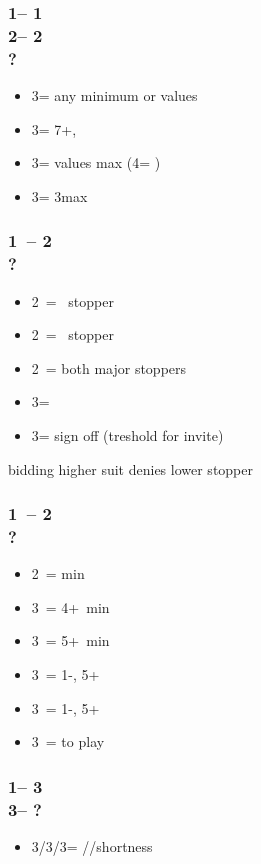 \documentclass[12pt, a4paper]{article}
\begin{document}
\subsubsection*{1\diams -- 1\spades\\
                2\diams -- 2\nt \\ ?}
\begin{itemize}
    \item 3\clubs = any minimum or \clubs values
    \item 3\diams = 7+\diams, \gf
    \item 3\hearts = \hearts values max (4\diams = \nf)
    \item 3\spades = 3\spades max
\end{itemize}

\subsubsection*{1\diams\ -- 2\diams \\ ?}
\begin{itemize}
    \item 2\hearts\ = \hearts\ stopper
    \item 2\spades\ = \spades\ stopper
    \item 2\nt\ = both major stoppers
    \item 3\clubs = \nat
    \item 3\diams = sign off (treshold for invite)
\end{itemize}

bidding higher suit denies lower stopper

\subsubsection*{1\diams\ -- 2\spades \\ ?}
\begin{itemize}
    \item 2\nt\ = \bal min
    \item 3\clubs\ = 4+\clubs\ min
    \item 3\diams\ = 5+\diams\ min
    \item 3\hearts\ = 1-\hearts, 5+\diams\ \gf
    \item 3\spades\ = 1-\spades, 5+\diams\ \gf
    \item 3\nt\ = to play
\end{itemize}

\subsubsection*{1\diams -- 3\clubs\\
                3\diams -- ?}
\begin{itemize}
    \item 3\hearts/3\spades/3\nt = \hearts/\spades/\clubs shortness
\end{itemize}

\end{document}
